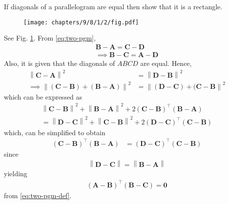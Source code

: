 \documentclass[10pt, a4paper]{article}
\providecommand{\norm}[1]{\left\lVert#1\right\rVert}
\let\vec\mathbf
\begin{document}
\title{\mytitle}
\author{\myauthor\hspace{1em}\\\contact\\FWC22008\hspace{6.5em}IITH\hspace{0.5em}\mymodule\hspace{6em}ASSIGN-4}
\date{}
	\maketitle
		
	\tableofcontents
\vspace{5mm}
\fi
If diagonals of a parallelogram are equal then show that it is a rectangle.

	\begin{figure}[H]
		\centering
		\texttt{[image: chapters/9/8/1/2/fig.pdf]}
		\caption{}
		\label{fig:9/8/1/2}
  	\end{figure}
	\solution 
   See Fig. 
		\ref{fig:9/8/1/2}.
   From 
	  \eqref{eq:two-pgm}, 
\begin{align}
	  \label{eq:two-pgm-def} 
 \vec{B} - \vec{A}= \vec{C}-\vec{D}
 \\
\implies  \vec{B} - \vec{C}= \vec{A}-\vec{D}
	\end{align}
	Also, it is given that the diagonals of $ABCD$ are equal.  Hence, 
\begin{align}
	\norm{\vec{C} - \vec{A}}^2&= \norm{\vec{D}-\vec{B}}^2
 \\
	\implies 
	\norm{(\vec{C}-\vec{B}) + (\vec{B}-\vec{A})}^2 &= \norm{(\vec{D}-\vec{C}) + (\vec{C}-\vec{B}}^2
\end{align}
which can be expressed as
\begin{multline}
	\norm{\vec{C}-\vec{B}}^2 + \norm{\vec{B}-\vec{A}}^2 + 2(\vec{C}-\vec{B})^{\top} (\vec{B}-\vec{A}) 
	\\
	= \norm{\vec{D}-\vec{C}}^2 + \norm{\vec{C}-\vec{B}}^2+2(\vec{D}-\vec{C})^{\top} (\vec{C}-\vec{B}) 
\end{multline}
which, can be simplified to obtain 
\begin{align}
	(\vec{C}-\vec{B})^{\top} (\vec{B}-\vec{A})&=(\vec{D}-\vec{C})^{\top} (\vec{C}-\vec{B}) 
\end{align}
since 
\begin{align}
\norm{\vec{D}-\vec{C}} =   
\norm{\vec{B}-\vec{A}}   
\end{align}
yielding 
\begin{align}
	(\vec{A}-\vec{B})^{\top} (\vec{B}-\vec{C})=\vec{0}
\end{align}
	  from \eqref{eq:two-pgm-def}.  
\end{document}
